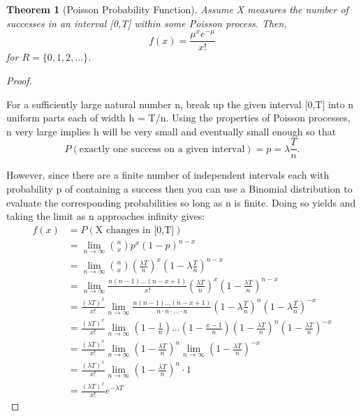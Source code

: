 \documentclass[10pt,]{book}
\theoremstyle{plain}
\newtheorem{theorem}{Theorem}[section]
\theoremstyle{definition}
\theoremstyle{definition}
\theoremstyle{definition}
\numberwithin{equation}{section}
\begin{document}
\begin{theorem}[{Poisson Probability Function}]\label{theorem-46}
Assume X measures the number of successes in an interval [0,T] within some Poisson process. Then, 
\begin{equation*}f(x) = \frac{\mu^x e^{-\mu}}{x!}\end{equation*}
for \(R = \{ 0, 1, 2, ... \}\).
%
\end{theorem}
\begin{proof}\hypertarget{proof-45}{}

For a sufficiently large natural number n, break up the given interval [0,T] into n uniform parts each of width h = T/n.  Using the properties of Poisson processes, n very large implies h will be very small and eventually small enough so that 
\begin{equation*}P(\text{exactly one success on a given interval}) = p = \lambda \frac{T}{n}.\end{equation*} 

However, since there are a finite number of independent intervals each with probability p of containing a success then you can use a Binomial distribution to evaluate the corresponding probabilities so long as n is finite. Doing so yields and taking the limit as n approaches infinity gives:
\begin{align*}
f(x) & = P(\text{X changes in [0,T]}) \\
 & = \lim_{n \rightarrow \infty} \binom{n}{x} p^x (1-p)^{n-x}\\
 & = \lim_{n \rightarrow \infty} \binom{n}{x} (\frac{\lambda T}{n})^x (1-\lambda \frac{T}{n})^{n-x}\\
 & = \lim_{n \rightarrow \infty} \frac{n(n-1)...(n-x+1)}{x!} ( \frac{\lambda T}{n})^x (1- \frac{\lambda T}{n})^{n-x}\\
 & = \frac{(\lambda T)^x}{x!} \lim_{n \rightarrow \infty} \frac{n(n-1)...(n-x+1)}{n \cdot n \cdot ... \cdot n} (1-\lambda \frac{T}{n})^{n}(1-\lambda \frac{T}{n})^{-x}\\
 & = \frac{(\lambda T)^x}{x!} \lim_{n \rightarrow \infty} (1-\frac{1}{n})...(1-\frac{x-1}{n})  (1- \frac{\lambda T}{n})^{n}(1- \frac{\lambda T}{n})^{-x}\\
 & = \frac{(\lambda T)^x}{x!} 
	\lim_{n \rightarrow \infty} (1- \frac{\lambda T}{n})^{n}
	\lim_{n \rightarrow \infty} (1- \frac{\lambda T}{n})^{-x}\\
 & = \frac{(\lambda T)^x}{x!} 
	\lim_{n \rightarrow \infty} (1- \frac{\lambda T}{n})^{n} \cdot 1\\
 & = \frac{(\lambda T)^x}{x!} 
	e^{-\lambda T}
\end{align*}
%
\end{proof}
\end{document}
